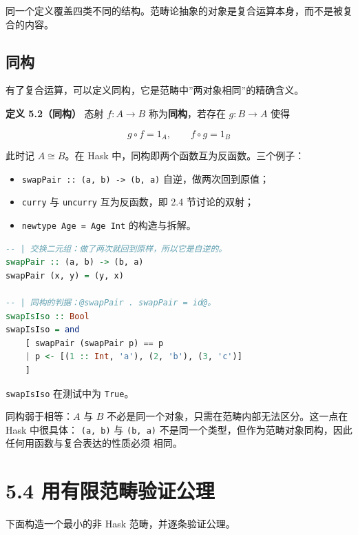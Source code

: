 同一个定义覆盖四类不同的结构。范畴论抽象的对象是复合运算本身，而不是被复合的内容。

\subsection{同构}\label{ux540cux6784}

有了复合运算，可以定义同构，它是范畴中''两对象相同''的精确含义。

\textbf{定义 5.2（同构）} 态射 \(f \colon A \to B\) 称为\textbf{同构}，若存在 \(g \colon B \to A\) 使得

\[g \circ f = 1_A, \qquad f \circ g = 1_B\]

此时记 \(A \cong B\)。在 Hask 中，同构即两个函数互为反函数。三个例子：

\begin{itemize}
\tightlist
\item
  \passthrough{\lstinline!swapPair :: (a, b) -> (b, a)!} 自逆，做两次回到原值；
\item
  \passthrough{\lstinline!curry!} 与 \passthrough{\lstinline!uncurry!} 互为反函数，即 2.4 节讨论的双射；
\item
  \passthrough{\lstinline!newtype Age = Age Int!} 的构造与拆解。
\end{itemize}

\begin{lstlisting}[language=Haskell]
-- | 交换二元组：做了两次就回到原样，所以它是自逆的。
swapPair :: (a, b) -> (b, a)
swapPair (x, y) = (y, x)

-- | 同构的判据：@swapPair . swapPair = id@。
swapIsIso :: Bool
swapIsIso = and
    [ swapPair (swapPair p) == p
    | p <- [(1 :: Int, 'a'), (2, 'b'), (3, 'c')]
    ]
\end{lstlisting}

\passthrough{\lstinline!swapIsIso!} 在测试中为 \passthrough{\lstinline!True!}。

同构弱于相等：\(A\) 与 \(B\) 不必是同一个对象，只需在范畴内部无法区分。这一点在 Hask 中很具体：
\passthrough{\lstinline!(a, b)!} 与 \passthrough{\lstinline!(b, a)!} 不是同一个类型，但作为范畴对象同构，因此任何用函数与复合表达的性质必须
相同。

\section{5.4 用有限范畴验证公理}\label{ux7528ux6709ux9650ux8303ux7574ux9a8cux8bc1ux516cux7406}

下面构造一个最小的非 Hask 范畴，并逐条验证公理。

